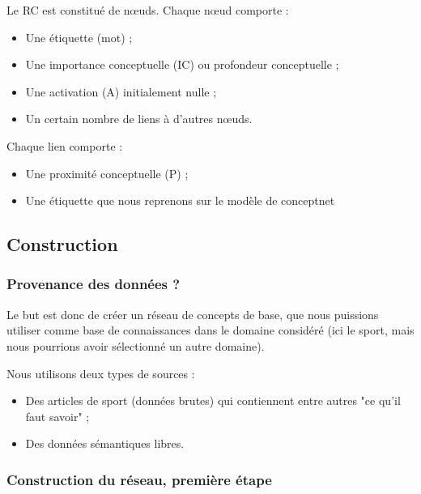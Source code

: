 \documentclass[a4paper,12pt]{article}
\begin{document}
Le RC est constitué de n\oe uds. Chaque n\oe ud comporte :
\begin{itemize}
  \item Une étiquette (mot) ;
 \item Une importance conceptuelle (IC) ou profondeur conceptuelle ;
 \item Une activation (A) initialement nulle ;
 \item Un certain nombre de liens à d'autres n\oe uds.
\end{itemize}

Chaque lien comporte :
\begin{itemize}
 \item Une proximité conceptuelle (P) ;
 \item Une étiquette que nous reprenons sur le modèle de conceptnet
\end{itemize}

\subsection{Construction}

\subsubsection{Provenance des données ?}

Le but est donc de créer un réseau de concepts de base, que nous puissions utiliser comme base de connaissances dans le domaine considéré (ici le sport, mais nous pourrions avoir sélectionné un autre domaine).

Nous utilisons deux types de sources :
\begin{itemize}
 \item Des articles de sport (données brutes) qui contiennent entre autres "ce qu'il faut savoir" ;
 \item Des données sémantiques libres.
\end{itemize}

\subsubsection{Construction du réseau, première étape}
\end{document}
